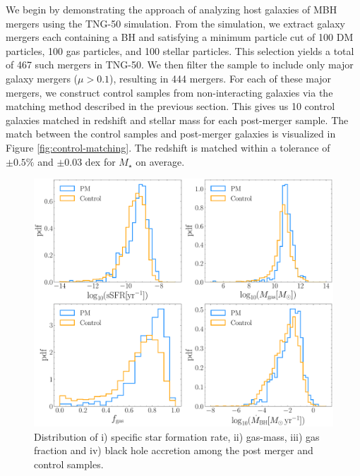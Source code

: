 \documentclass[11pt, letterpaper]{article}
\begin{document}
We begin by demonstrating the approach of analyzing host galaxies of MBH mergers using the TNG-50 simulation. From the simulation, we extract galaxy mergers each containing a BH and satisfying a minimum particle cut of 100 DM particles, 100 gas particles, and 100 stellar particles. This selection yields a total of 467 such mergers in TNG-50. We then filter the sample to include only major galaxy mergers ($\mu>0.1$), resulting in 444 mergers.  For each of these major mergers, we construct control samples from non-interacting galaxies via the matching method described in the previous section. This gives us 10 control galaxies matched in redshift and stellar mass for each post-merger sample. The match between the control samples and post-merger galaxies is visualized in Figure \ref{fig:control-matching}. The redshift is matched within a tolerance of $\pm 0.5\%$  and $\pm 0.03$ dex for $M_{\star}$ on average. 

\begin{figure}
    \centering
    \includegraphics[width=0.7\linewidth]{fig/mergers_vs_control_properties_hist.pdf}
    \caption{Distribution of i) specific star formation rate, ii) gas-mass, iii) gas fraction and iv) black hole accretion among the post merger and control samples.}
    \label{fig:hist-merger-control-comparison}
\end{figure}
\end{document}
